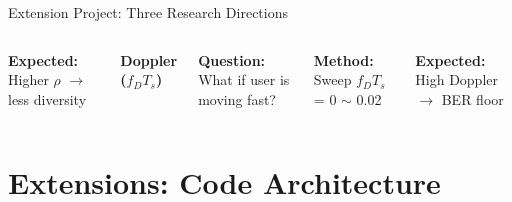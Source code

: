 \documentclass[aspectratio=169]{beamer}
\begin{document}
\begin{frame}{Extension Project: Three Research Directions}
\begin{columns}[t]
    \vspace{0.2em}
    \textbf{Expected:} Higher $\rho$ $\to$ less diversity
    
    \centering
    \textbf{\footnotesize Doppler ($f_DT_s$)}
    
    \vspace{0.2em}
    \scriptsize
    \raggedright
    \textbf{Question:} What if user is moving fast?
    
    \vspace{0.2em}
    \textbf{Method:} Sweep $f_DT_s$ = 0 $\sim$ 0.02
    
    \vspace{0.2em}
    \textbf{Expected:} High Doppler $\to$ BER floor
  \end{columns}
\end{frame}

\section{Extensions: Code Architecture}
\end{document}

